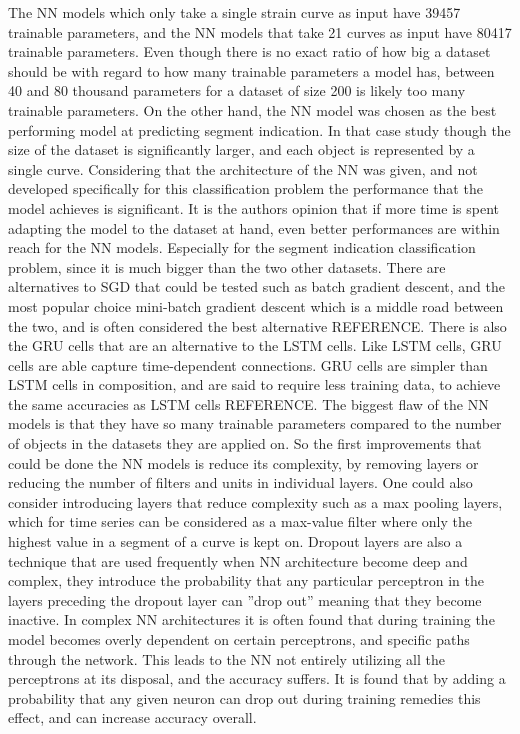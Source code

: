 The NN models which only take a single strain curve as input have 39457 trainable parameters, and the NN models that take 21 curves as input have 80417 trainable parameters.
Even though there is no exact ratio of how big a dataset should be with regard to how many trainable parameters a model has, between 40 and 80 thousand parameters for a dataset of size 200 is likely too many trainable parameters.
On the other hand, the NN model was chosen as the best performing model at predicting segment indication. 
In that case study though the size of the dataset is significantly larger, and each object is represented by a single curve. 
Considering that the architecture of the NN was given, and not developed specifically for this classification problem the performance that the model achieves is significant. 
It is the authors opinion that if more time is spent adapting the model to the dataset at hand, even better performances are within reach for the NN models. 
Especially for the segment indication classification problem, since it is much bigger than the two other datasets.
There are alternatives to SGD that could be tested such as batch gradient descent, and the most popular choice mini-batch gradient descent which is a middle road between the two, and is often considered the best alternative REFERENCE.
There is also the GRU cells that are an alternative to the LSTM cells. Like LSTM cells, GRU cells are able capture time-dependent connections. GRU cells are simpler than LSTM cells in composition, and are said to require less training data, to achieve the same accuracies as LSTM cells REFERENCE.
The biggest flaw of the NN models is that they have so many trainable parameters compared to the number of objects in the datasets they are applied on.
So the first improvements that could be done the NN models is reduce its complexity, by removing layers or reducing the number of filters and units in individual layers.
One could also consider introducing layers that reduce complexity such as a max pooling layers, which for time series can be considered as a max-value filter where only the highest value in a segment of a curve is kept on. 
Dropout layers are also a technique that are used frequently when NN architecture become deep and complex, they introduce the probability that any particular perceptron in the layers preceding the dropout layer can ''drop out'' meaning that they become inactive.
In complex NN architectures it is often found that during training the model becomes overly dependent on certain perceptrons, and specific paths through the network. This leads to the NN not entirely utilizing all the perceptrons at its disposal, and the accuracy suffers. It is found that by adding a probability that any given neuron can drop out during training remedies this effect, and can increase accuracy overall.
